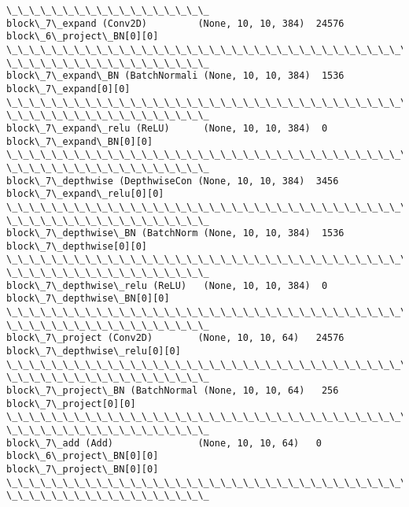 \documentclass[11pt]{article}
\begin{document}
\begin{Verbatim}[commandchars=\\\{\}]
\_\_\_\_\_\_\_\_\_\_\_\_\_\_\_\_\_\_
block\_7\_expand (Conv2D)         (None, 10, 10, 384)  24576
block\_6\_project\_BN[0][0]
\_\_\_\_\_\_\_\_\_\_\_\_\_\_\_\_\_\_\_\_\_\_\_\_\_\_\_\_\_\_\_\_\_\_\_\_\_\_\_\_\_\_\_\_\_\_\_\_\_\_\_\_\_\_\_\_\_\_\_\_\_\_\_\_\_\_\_\_\_\_\_\_\_\_\_\_\_\_\_\_
\_\_\_\_\_\_\_\_\_\_\_\_\_\_\_\_\_\_
block\_7\_expand\_BN (BatchNormali (None, 10, 10, 384)  1536
block\_7\_expand[0][0]
\_\_\_\_\_\_\_\_\_\_\_\_\_\_\_\_\_\_\_\_\_\_\_\_\_\_\_\_\_\_\_\_\_\_\_\_\_\_\_\_\_\_\_\_\_\_\_\_\_\_\_\_\_\_\_\_\_\_\_\_\_\_\_\_\_\_\_\_\_\_\_\_\_\_\_\_\_\_\_\_
\_\_\_\_\_\_\_\_\_\_\_\_\_\_\_\_\_\_
block\_7\_expand\_relu (ReLU)      (None, 10, 10, 384)  0
block\_7\_expand\_BN[0][0]
\_\_\_\_\_\_\_\_\_\_\_\_\_\_\_\_\_\_\_\_\_\_\_\_\_\_\_\_\_\_\_\_\_\_\_\_\_\_\_\_\_\_\_\_\_\_\_\_\_\_\_\_\_\_\_\_\_\_\_\_\_\_\_\_\_\_\_\_\_\_\_\_\_\_\_\_\_\_\_\_
\_\_\_\_\_\_\_\_\_\_\_\_\_\_\_\_\_\_
block\_7\_depthwise (DepthwiseCon (None, 10, 10, 384)  3456
block\_7\_expand\_relu[0][0]
\_\_\_\_\_\_\_\_\_\_\_\_\_\_\_\_\_\_\_\_\_\_\_\_\_\_\_\_\_\_\_\_\_\_\_\_\_\_\_\_\_\_\_\_\_\_\_\_\_\_\_\_\_\_\_\_\_\_\_\_\_\_\_\_\_\_\_\_\_\_\_\_\_\_\_\_\_\_\_\_
\_\_\_\_\_\_\_\_\_\_\_\_\_\_\_\_\_\_
block\_7\_depthwise\_BN (BatchNorm (None, 10, 10, 384)  1536
block\_7\_depthwise[0][0]
\_\_\_\_\_\_\_\_\_\_\_\_\_\_\_\_\_\_\_\_\_\_\_\_\_\_\_\_\_\_\_\_\_\_\_\_\_\_\_\_\_\_\_\_\_\_\_\_\_\_\_\_\_\_\_\_\_\_\_\_\_\_\_\_\_\_\_\_\_\_\_\_\_\_\_\_\_\_\_\_
\_\_\_\_\_\_\_\_\_\_\_\_\_\_\_\_\_\_
block\_7\_depthwise\_relu (ReLU)   (None, 10, 10, 384)  0
block\_7\_depthwise\_BN[0][0]
\_\_\_\_\_\_\_\_\_\_\_\_\_\_\_\_\_\_\_\_\_\_\_\_\_\_\_\_\_\_\_\_\_\_\_\_\_\_\_\_\_\_\_\_\_\_\_\_\_\_\_\_\_\_\_\_\_\_\_\_\_\_\_\_\_\_\_\_\_\_\_\_\_\_\_\_\_\_\_\_
\_\_\_\_\_\_\_\_\_\_\_\_\_\_\_\_\_\_
block\_7\_project (Conv2D)        (None, 10, 10, 64)   24576
block\_7\_depthwise\_relu[0][0]
\_\_\_\_\_\_\_\_\_\_\_\_\_\_\_\_\_\_\_\_\_\_\_\_\_\_\_\_\_\_\_\_\_\_\_\_\_\_\_\_\_\_\_\_\_\_\_\_\_\_\_\_\_\_\_\_\_\_\_\_\_\_\_\_\_\_\_\_\_\_\_\_\_\_\_\_\_\_\_\_
\_\_\_\_\_\_\_\_\_\_\_\_\_\_\_\_\_\_
block\_7\_project\_BN (BatchNormal (None, 10, 10, 64)   256
block\_7\_project[0][0]
\_\_\_\_\_\_\_\_\_\_\_\_\_\_\_\_\_\_\_\_\_\_\_\_\_\_\_\_\_\_\_\_\_\_\_\_\_\_\_\_\_\_\_\_\_\_\_\_\_\_\_\_\_\_\_\_\_\_\_\_\_\_\_\_\_\_\_\_\_\_\_\_\_\_\_\_\_\_\_\_
\_\_\_\_\_\_\_\_\_\_\_\_\_\_\_\_\_\_
block\_7\_add (Add)               (None, 10, 10, 64)   0
block\_6\_project\_BN[0][0]
block\_7\_project\_BN[0][0]
\_\_\_\_\_\_\_\_\_\_\_\_\_\_\_\_\_\_\_\_\_\_\_\_\_\_\_\_\_\_\_\_\_\_\_\_\_\_\_\_\_\_\_\_\_\_\_\_\_\_\_\_\_\_\_\_\_\_\_\_\_\_\_\_\_\_\_\_\_\_\_\_\_\_\_\_\_\_\_\_
\_\_\_\_\_\_\_\_\_\_\_\_\_\_\_\_\_\_

\end{Verbatim}
\end{document}
